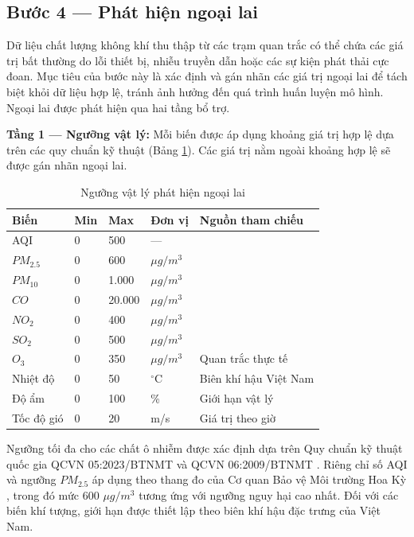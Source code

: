 \subsection{Bước 4 --- Phát hiện ngoại lai}

Dữ liệu chất lượng không khí thu thập từ các trạm quan trắc có thể chứa các giá trị bất thường do lỗi thiết bị, nhiễu truyền dẫn hoặc các sự kiện phát thải cực đoan. Mục tiêu của bước này là xác định và gán nhãn các giá trị ngoại lai để tách biệt khỏi dữ liệu hợp lệ, tránh ảnh hưởng đến quá trình huấn luyện mô hình. Ngoại lai được phát hiện qua hai tầng bổ trợ.

\textbf{Tầng 1 --- Ngưỡng vật lý:} Mỗi biến được áp dụng khoảng giá trị hợp lệ dựa trên các quy chuẩn kỹ thuật (Bảng \ref{tab:nguong_vat_ly}). Các giá trị nằm ngoài khoảng hợp lệ sẽ được gán nhãn ngoại lai.

\begin{table}[H]
    \centering
    \caption{Ngưỡng vật lý phát hiện ngoại lai}
    \label{tab:nguong_vat_ly}
    \renewcommand{\arraystretch}{1.3}
    \begin{tabular}{p{2.5cm} p{1.5cm} p{1.5cm} p{2.5cm} p{5.5cm}}
    \toprule
    \textbf{Biến} & \textbf{Min} & \textbf{Max} & \textbf{Đơn vị} & \textbf{Nguồn tham chiếu} \\
    \midrule
    AQI & 0 & 500 & --- & \cite{USEPA_AQI} \\
    $PM_{2.5}$ & 0 & 600 & $\mu g/m^3$ & \cite{USEPA_AQI} \\
    $PM_{10}$ & 0 & 1.000 & $\mu g/m^3$ & \cite{QCVN05_2023} \\
    $CO$ & 0 & 20.000 & $\mu g/m^3$ & \cite{QCVN05_2023} \\
    $NO_2$ & 0 & 400 & $\mu g/m^3$ & \cite{QCVN05_2023} \\
    $SO_2$ & 0 & 500 & $\mu g/m^3$ & \cite{QCVN06_2009} \\
    $O_3$ & 0 & 350 & $\mu g/m^3$ & Quan trắc thực tế \\
    Nhiệt độ & 0 & 50 & $^\circ$C & Biên khí hậu Việt Nam \\
    Độ ẩm & 0 & 100 & \% & Giới hạn vật lý \\
    Tốc độ gió & 0 & 20 & m/s & Giá trị theo giờ \\
    \bottomrule
    \end{tabular}
\end{table}


Ngưỡng tối đa cho các chất ô nhiễm được xác định dựa trên Quy chuẩn kỹ thuật quốc gia QCVN 05:2023/BTNMT \cite{QCVN05_2023} và QCVN 06:2009/BTNMT \cite{QCVN06_2009}. Riêng chỉ số AQI và ngưỡng $PM_{2.5}$ áp dụng theo thang đo của Cơ quan Bảo vệ Môi trường Hoa Kỳ \cite{USEPA_AQI}, trong đó mức 600 $\mu g/m^3$ tương ứng với ngưỡng nguy hại cao nhất. Đối với các biến khí tượng, giới hạn được thiết lập theo biên khí hậu đặc trưng của Việt Nam.

